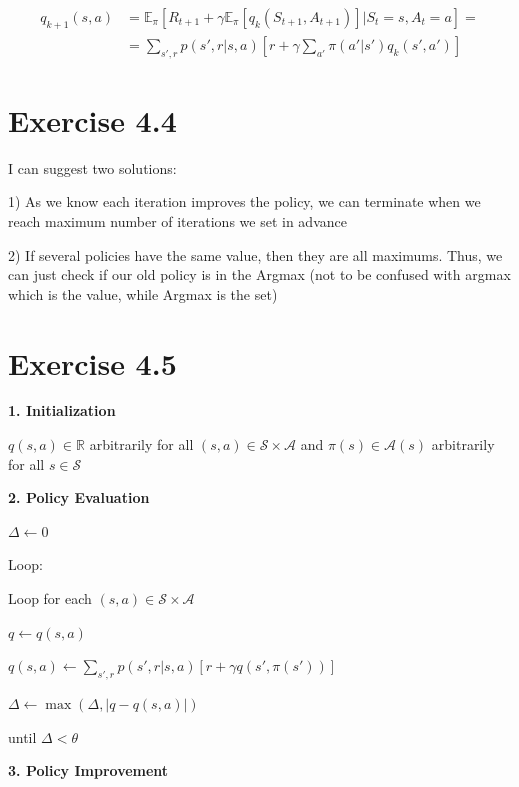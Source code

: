 \documentclass[12pt]{article}
\begin{document}
        \begin{align*}
            q_{k+1}(s,a) &= \mathbb{E}_\pi[R_{t+1} +
            \gamma \mathbb{E}_\pi[q_k(S_{t+1},A_{t+1})]
            |S_t=s,A_t=a] =\\
            &= \sum\limits_{s',r} p(s',r|s,a)[r +
            \gamma \sum\limits_{a'} \pi(a'|s') q_k(s',a')]
        \end{align*}

    \section{Exercise 4.4}
        I can suggest two solutions:

        1) As we know each iteration improves the policy, we can terminate when
        we reach maximum number of iterations we set in advance

        2) If several policies have the same value, then they are all maximums.
        Thus, we can just check if our old policy is in the Argmax (not to be
        confused with argmax which is the value, while Argmax is the set)

    \section{Exercise 4.5}
        \textbf{1. Initialization}

        \qquad $q(s, a) \in \mathbb{R}$ arbitrarily for all
        $(s,a) \in \mathcal{S} \times \mathcal{A}$ and $\pi(s) \in \mathcal{A}(s)$
        arbitrarily for all $s \in \mathcal{S}$

        \bigskip

        \textbf{2. Policy Evaluation}

        \qquad $\Delta \leftarrow 0$

        \qquad Loop:

        \qquad \qquad Loop for each $(s, a) \in \mathcal{S} \times \mathcal{A}$

        \qquad \qquad \qquad $q \leftarrow q(s, a)$

        \qquad \qquad \qquad $q(s, a) \leftarrow \sum\limits_{s',r} p(s',r|s,a)
        [r + \gamma q(s',\pi(s'))]$

        \qquad \qquad \qquad $\Delta \leftarrow \max(\Delta, |q - q(s, a)|)$

        \qquad until $\Delta < \theta$

        \bigskip

        \textbf{3. Policy Improvement}
\end{document}
